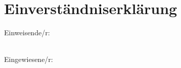 \section{Einverständniserklärung}
Einweisende/r:\\
\begin{Form}
\end{Form}
\leavevmode
~\\
Eingewiesene/r:\\
\begin{Form}
\end{Form}
